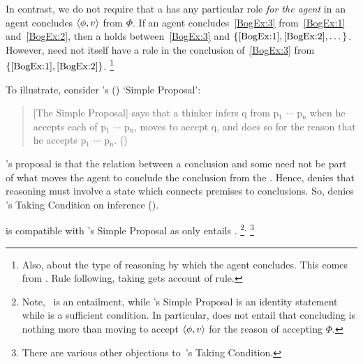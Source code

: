 \begin{note}
  In contrast, we do not require that a \fingfr{} has any particular role \emph{for the agent} in  an agent concludes \(\langle\phi, v\rangle\) from \(\Phi\).
  If an agent concludes~\ref{BogEx:3} from~\ref{BogEx:1} and~\ref{BogEx:2}, then a \fingfr{} holds between~\ref{BogEx:3} and \(\{\ref{BogEx:1}, \ref{BogEx:2}, \dots\}\).
  However, \fingfb{\ref{BogEx:3}}{\(\{\ref{BogEx:1}, \ref{BogEx:2}, \dots\}\)} need not itself have a role in the \agents{} conclusion of~\ref{BogEx:3} from \(\{\ref{BogEx:1}, \ref{BogEx:2}\}\).%
  \footnote{
    Also, about the type of reasoning by which the agent concludes.
    This comes from \textcite{Boghossian:2008vf,Boghossian:2012vb}.
    Rule following, taking gets account of rule.
  }

  \label{wrightSimp}%
  To illustrate, consider \citeauthor{Wright:2014tt}'s (\citeyear{Wright:2014tt}) `Simple Proposal':
  \begin{quote}
    [The Simple Proposal] says that a thinker infers q from p\(_{1}\) \(\cdots\) p\(_{\text{n}}\) when he accepts each of p\(_{1}\) \(\cdots\) p\(_{\text{n}}\), moves to accept q, and does so for the reason that he accepts p\(_{1}\) \(\cdots\) p\(_{\text{n}}\).%
    \mbox{}\hfill\mbox{(\citeyear[33]{Wright:2014tt})}
  \end{quote}
  \citeauthor{Wright:2014tt}'s proposal is that the relation between a conclusion and some \pool{} need not be part of what moves the agent to conclude the conclusion from the \pool{}.
  Hence, \citeauthor{Wright:2014tt} denies that reasoning must involve a state which connects premises to conclusions.
  So, \citeauthor{Wright:2014tt} denies \citeauthor{Boghossian:2008vf}'s Taking Condition on inference  (\citeyear[Cf.][33-34]{Wright:2014tt}).

  \supportI{} is compatible with \citeauthor{Wright:2014tt}'s Simple Proposal as \supportI{} only entails .%
  \footnote{
    Note,~\supportI{} is an entailment, while \citeauthor{Wright:2014tt}'s Simple Proposal is an identity statement while \supportI{} is a sufficient condition.
    In particular, \supportI{} does not entail that concluding is nothing more than moving to accept \(\langle\phi, v\rangle\) for the reason of accepting \(\Phi\).
  }\(^{,}\)%
  \footnote{
    There are various other objections to~\citeauthor{Boghossian:2014aa}'s Taking Condition.

}
\end{note}
